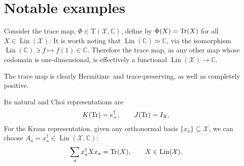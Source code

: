 \documentclass[12pt]{report}
\newcommand{\CC}{\mathbb{C}}
\newcommand{\calX}{{\mathcal{X}}}
\newcommand{\rmT}{{\mathrm{T}}}
\DeclareMathOperator{\Lin}{Lin}
\begin{document}
\section{Notable examples}

\begin{example}
	Consider the trace map, $\Phi\in\rmT(\calX,\CC)$, define by $\Phi(X)=\Tr(X)$ for all $X\in\Lin(\calX)$.
	It is worth noting that $\Lin(\CC)\simeq \CC$, via the isomorphism
	$\Lin(\CC)\ni f\mapsto f(1)\in\CC$.
	Therefore the trace map, as any other map whose codomain is one-dimensional, is effectively a functional $\Lin(\calX)\to\CC$.

	The trace map is clearly Hermitian- and trace-preserving, as well as completely positive.

	Its natural and Choi representations are
	\begin{equation}
		K(\Tr) = e_+^\dagger,
		\qquad J(\Tr) = I_{\calX}.
	\end{equation}
	For the Kraus representation, given any orthonormal basis $\{x_a\}\subseteq\calX$, we can choose $A_a=x_a^\dagger\in\Lin(\calX,\CC)$:
	\begin{equation}
		\sum_a x_a^\dagger X x_a = \Tr(X),
		\qquad X\in\Lin(\calX).
	\end{equation}

\end{example}
\end{document}

